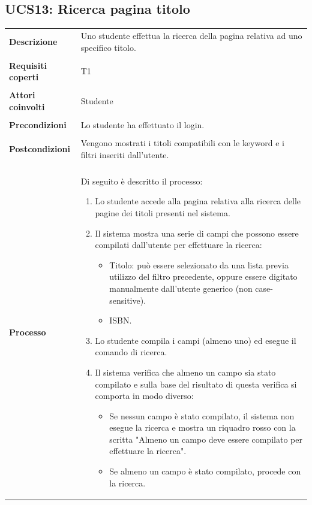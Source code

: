 \documentclass[10pt,a4paper]{report}
\begin{document}
	\subsection{UCS13: Ricerca pagina titolo}
	\begin{tabular}{lp{}}
		\textbf{Descrizione}&Uno studente effettua la ricerca della pagina relativa ad uno specifico titolo.\\
		\\
		\textbf{Requisiti coperti}&T1\\
		\\
		\textbf{Attori coinvolti}&Studente\\
		\\
		\textbf{Precondizioni}&Lo studente ha effettuato il login.\\
		\\
		\textbf{Postcondizioni}&Vengono mostrati i titoli compatibili con le keyword e i filtri inseriti dall'utente.\\
		\\
		\textbf{Processo}&Di seguito è descritto il processo:
		\begin{enumerate}
			\item Lo studente accede alla pagina relativa alla ricerca delle pagine dei titoli presenti nel sistema.
			\item Il sistema mostra una serie di campi che possono essere compilati dall'utente per effettuare la ricerca:
			\begin{itemize}
				\item Titolo: può essere selezionato da una lista previa utilizzo del filtro precedente, oppure essere digitato manualmente dall'utente generico (non case-sensitive).
				\item ISBN.			
			\end{itemize}
			\item Lo studente compila i campi (almeno uno) ed esegue il comando di ricerca.
			\item Il sistema verifica che almeno un campo sia stato compilato e sulla base del risultato di questa verifica si comporta in modo diverso:
			\begin{itemize}
				\item Se nessun campo è stato compilato, il sistema non esegue la ricerca e mostra un riquadro rosso con la scritta "Almeno un campo deve essere compilato per effettuare la ricerca".
				\item Se almeno un campo è stato compilato, procede con la ricerca.
			\end{itemize}

\end{enumerate}
\end{tabular}
\end{document}
